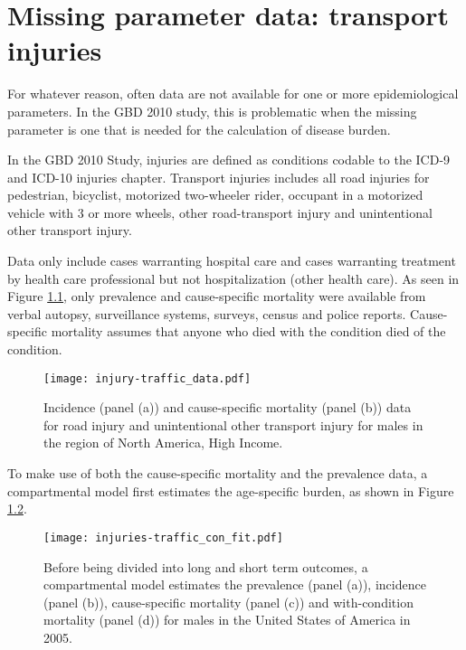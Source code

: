 \chapter{Missing parameter data: transport injuries}
\label{applications-double_dismod}

For whatever reason, often data are not available for one or more epidemiological parameters.  In the GBD 2010 study, this is problematic when the missing parameter is one that is needed for the calculation of disease burden.

In the GBD 2010 Study, injuries are defined as conditions codable to the ICD-9 and ICD-10 injuries chapter.  Transport injuries includes all road injuries for pedestrian, bicyclist, motorized two-wheeler rider, occupant in a motorized vehicle with 3 or more wheels, other road-transport injury and unintentional other transport injury.

Data only include cases warranting hospital care and cases warranting treatment by health care professional but not hospitalization (other health care).  As seen in Figure \ref{fig:app-injury traffic data}, only prevalence and cause-specific mortality were available from verbal autopsy, surveillance systems, surveys, census and police reports.  Cause-specific mortality assumes that anyone who died with the condition died of the condition.

    \begin{figure}[h]
        \begin{center}
            \texttt{[image: injury-traffic\_data.pdf]}
            \caption{Incidence (panel (a)) and cause-specific mortality (panel (b)) data for road injury and unintentional other transport injury for males in the region of North America, High Income.}
            \label{fig:app-injury traffic data}
        \end{center}
    \end{figure}

To make use of both the cause-specific mortality and the prevalence data, a compartmental model first estimates the age-specific burden, as shown in Figure \ref{fig:app-injury traffic fit}.  

    \begin{figure}[h]
        \begin{center}
            \texttt{[image: injuries-traffic\_con\_fit.pdf]}
            \caption{Before being divided into long and short term outcomes, a compartmental model estimates the prevalence (panel (a)), incidence (panel (b)), cause-specific mortality (panel (c)) and with-condition mortality (panel (d)) for males in the United States of America in 2005.}
            \label{fig:app-injury traffic fit}
        \end{center}
    \end{figure}


